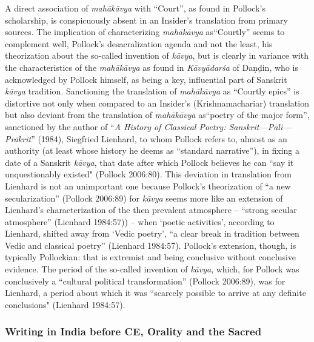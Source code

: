 A direct association of \textit{mahākāvya} with “Court”, as found in Pollock’s scholarship, is conspicuously absent in an Insider’s translation from primary sources. The implication of characterizing \textit{mahākāvya} as\break “Courtly” seems to complement well, Pollock’s desacralization agenda and not the least, his theorization about the so-called invention of \textit{kāvya}, but is clearly in variance with the characteristics of the \textit{mahā\-kāvya} as found in \textit{Kāvyādarśa} of Daṇḍin, who is acknowledged by Pollock himself, as being a key, influential part of Sanskrit \textit{kāvya} tradition. Sanctioning the translation of \textit{mahākāvya} as “Courtly epics” is distortive not only when compared to an Insider’s (Krishnamachariar) translation but also deviant from the translation of \textit{mahākāvya} as\break “poetry of the major form”, sanctioned by the author of “\textit{A History of Classical Poetry: Sanskrit—Pāli—Prākrit}”\textit{} (1984), Siegfried Lienhard, to whom Pollock refers to, almost as an authority (at least whose history he deems as “standard narrative”), in fixing a date of a Sanskrit \textit{kāvya}, that date after which Pollock believes he can “say it unquestionably existed" (Pollock 2006:80). This deviation in translation from Lienhard is not an unimportant one because Pollock’s theorization of “a new secularization” (Pollock 2006:89) for \textit{kāvya} seems more like an extension of Lienhard’s characterization of the then prevalent atmosphere – “strong secular atmosphere” (Lienhard 1984:57)) – when ‘poetic activities’, according to Lienhard, shifted away from ‘Vedic poetry’, “a clear break in tradition between Vedic and classical poetry” (Lienhard 1984:57). Pollock’s extension, though, is typically Pollockian: that is extremist and being conclusive without conclusive evidence. The period of the so-called invention of \textit{kāvya}, which, for Pollock was conclusively a “cultural political transformation” (Pollock 2006:89), was for Lienhard, a period about which it was “scarcely possible to arrive at any definite conclusions" (Lienhard 1984:57).


\subsubsection{Writing in India before CE, Orality and the Sacred}

\vskip -3pt

